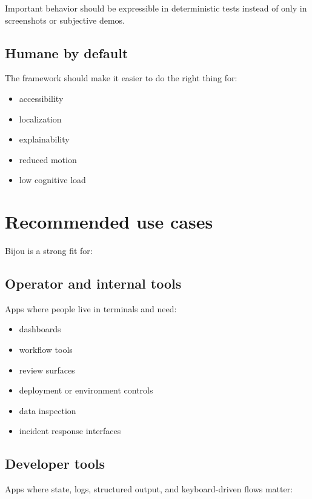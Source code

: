 Important behavior should be expressible in deterministic tests instead of only in screenshots or subjective demos.

\subsection{Humane by default}\label{record-035-humane-by-default}

The framework should make it easier to do the right thing for:

\begin{itemize}
\tightlist
\item
  accessibility
\item
  localization
\item
  explainability
\item
  reduced motion
\item
  low cognitive load
\end{itemize}

\section{Recommended use cases}\label{record-035-recommended-use-cases}

Bijou is a strong fit for:

\subsection{Operator and internal tools}\label{record-035-operator-and-internal-tools}

Apps where people live in terminals and need:

\begin{itemize}
\tightlist
\item
  dashboards
\item
  workflow tools
\item
  review surfaces
\item
  deployment or environment controls
\item
  data inspection
\item
  incident response interfaces
\end{itemize}

\subsection{Developer tools}\label{record-035-developer-tools}

Apps where state, logs, structured output, and keyboard-driven flows matter:

